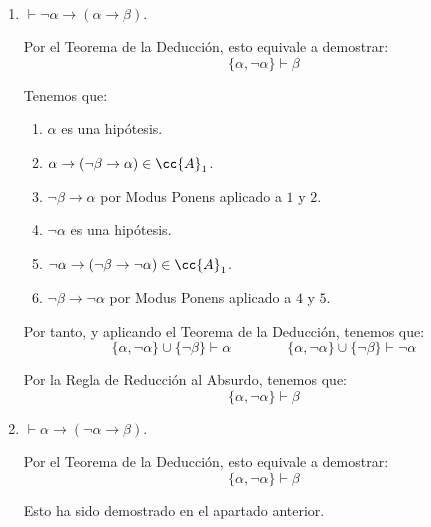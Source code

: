 \begin{ejercicio}\label{ej:1.7}~
    \begin{enumerate}
        \item $\vdash \neg\alpha \rightarrow (\alpha \rightarrow \beta)$.
        
        Por el Teorema de la Deducción, esto equivale a demostrar:
        \begin{equation*}
            \{\alpha,\neg\alpha\} \vdash \beta
        \end{equation*}

        Tenemos que:
        \begin{enumerate}[label=\arabic*.]
            \item $\alpha$ es una hipótesis.
            \item $\alpha\rightarrow(\neg\beta\rightarrow\alpha)\in \cc{A}_1$.
            \item $\neg\beta \rightarrow \alpha$ por Modus Ponens aplicado a $1$ y $2$.
            \item $\neg \alpha$ es una hipótesis.
            \item $\neg\alpha\rightarrow(\neg\beta\rightarrow\neg\alpha)\in \cc{A}_1$.
            \item $\neg\beta \rightarrow \neg\alpha$ por Modus Ponens aplicado a $4$ y $5$.
        \end{enumerate}

        Por tanto, y aplicando el Teorema de la Deducción, tenemos que:
        \begin{equation*}
            \{\alpha,\neg\alpha\} \cup \{\neg \beta\} \vdash \alpha\qquad\qquad\{\alpha,\neg\alpha\} \cup \{\neg \beta\} \vdash \neg\alpha
        \end{equation*}

        Por la Regla de Reducción al Absurdo, tenemos que:
        \begin{equation*}
            \{\alpha,\neg\alpha\} \vdash \beta
        \end{equation*}
        \item $\vdash \alpha \rightarrow (\neg\alpha \rightarrow \beta)$.
        
        Por el Teorema de la Deducción, esto equivale a demostrar:
        \begin{equation*}
            \{\alpha,\neg\alpha\} \vdash \beta
        \end{equation*}

        Esto ha sido demostrado en el apartado anterior.
    \end{enumerate}
\end{ejercicio}

